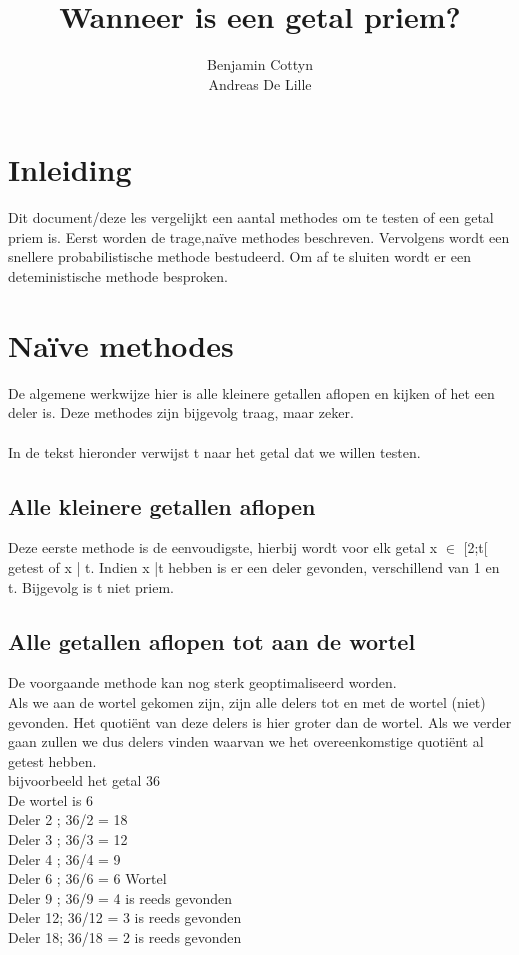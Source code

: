 \documentclass[11pt]{article}
\title{\textbf{Wanneer is een getal priem?}}
\author{Benjamin Cottyn\\
		Andreas De Lille}
\date{}
\begin{document}
\maketitle

\section{Inleiding}
Dit document/deze les vergelijkt een aantal methodes om te testen of een getal priem is.
Eerst worden de trage,naïve methodes beschreven. Vervolgens wordt een snellere probabilistische methode bestudeerd.
Om af te sluiten wordt er een deteministische methode besproken.

\section{Naïve methodes}
De algemene werkwijze hier is alle kleinere getallen aflopen en kijken of het een deler is.
Deze methodes zijn bijgevolg traag, maar zeker.\\\\
In de tekst hieronder verwijst t naar het getal dat we willen testen.

\subsection{Alle kleinere getallen aflopen}
Deze eerste methode is de eenvoudigste, hierbij wordt voor elk getal x $\in$ [2;t[ getest of x | t.
Indien x |t hebben is er een deler gevonden, verschillend van 1 en t. Bijgevolg is t niet priem.

\subsection{Alle getallen aflopen tot aan de wortel}
De voorgaande methode kan nog sterk geoptimaliseerd worden.\\
Als we aan de wortel gekomen zijn, zijn alle delers tot en met de wortel (niet) gevonden.
Het quotiënt van deze delers is hier groter dan de wortel.
Als we verder gaan zullen we dus delers vinden waarvan we het overeenkomstige quotiënt al getest hebben.\\
\newpage
bijvoorbeeld het getal 36\\
De wortel is 6\\
Deler 2 ; 36/2  = 18 \\
Deler 3 ; 36/3  = 12 \\
Deler 4 ; 36/4  = 9 \\
Deler 6 ; 36/6  = 6 Wortel \\
Deler 9 ; 36/9  = 4 is reeds gevonden \\
Deler 12; 36/12 = 3 is reeds gevonden \\
Deler 18; 36/18 = 2 is reeds gevonden \\
\end{document}
